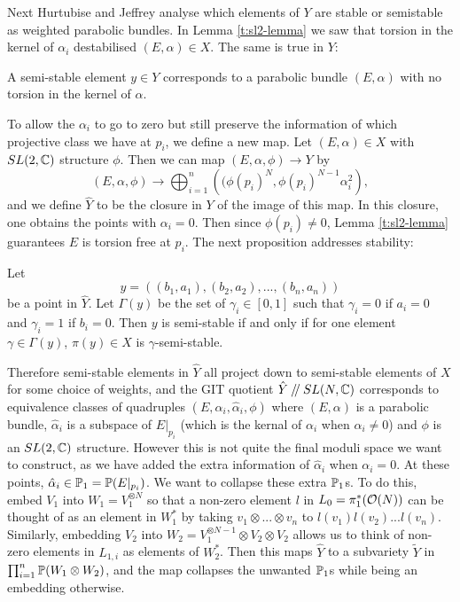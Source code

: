 	Next Hurtubise and Jeffrey analyse which elements of $Y$ are stable or semistable as weighted parabolic bundles. In Lemma \ref{t:sl2-lemma} we saw that torsion in the kernel of $\alpha_i$ destabilised $(E,\alpha) \in X$. The same is true in $Y$:
	\begin{lemma}
		A semi-stable element $y\in Y$ corresponds to a parabolic bundle $(E,\alpha)$ with no torsion in the kernel of $\alpha$.
	\end{lemma}
	To allow the $\alpha_i$ to go to zero but still preserve the information of which projective class we have at $p_i$, we define a new map. Let $(E,\alpha)\in X$ with $SL(2,\mathbb{C})$ structure $\phi$. Then we can map $(E,\alpha,\phi)\to Y$ by
	\begin{equation}
		(E,\alpha,\phi) \to \bigoplus_{i=1}^n\left(
		(\phi(p_i)^N, \phi(p_i)^{N-1}\alpha_i^2
		\right),
	\end{equation}
	and we define $\hat{Y}$ to be the closure in $Y$ of the image of this map. In this closure, one obtains the points with $\alpha_i =0$. Then since $\phi(p_i)\neq 0$, Lemma \ref{t:sl2-lemma} guarantees $E$ is torsion free at $p_i$. The next proposition addresses stability:
	\begin{theorem}
		Let 
		\begin{equation}
			y = \left(
			(b_1, a_1), (b_2, a_2),...,(b_n, a_n)
			\right)
		\end{equation}
		be a point in $\hat{Y}$. Let $\Gamma(y)$ be the set of $\gamma_i \in [0,1]$ such that $\gamma_i =0$ if $a_i =0$ and $\gamma_i = 1$ if $b_i = 0$. Then $y$ is semi-stable if and only if for one element $\gamma \in \Gamma(y)$, $\pi(y)\in X$ is $\gamma$-semi-stable.
	\end{theorem}
	Therefore semi-stable elements in $\hat{Y}$ all project down to semi-stable elements of $X$ for some choice of weights, and the GIT quotient $\hat{Y}\mathbin{/\mkern-4mu/} SL(N,\mathbb{C})$ corresponds to equivalence classes of quadruples $(E,\alpha_i, \hat{\alpha}_i, \phi)$ where $(E,\alpha)$ is a parabolic bundle, $\hat{\alpha}_i$ is a subspace of $E|_{p_i}$ (which is the kernal of $\alpha_i$ when $\alpha_i \neq 0$) and $\phi$ is an $SL(2,\mathbb{C})$ structure. However this is not quite the final moduli space we want to construct, as we have added the extra information of $\hat{\alpha}_i$ when $\alpha_i = 0$. At these points, $\hat{\alpha}_i \in \mathbb{P}_1=\mathbb{P}(E|_{p_i})$. We want to collapse these extra $\mathbb{P}_1$s. To do this, embed $V_1$ into $W_1 = V_1^{\otimes N}$ so that a non-zero element $l$ in $L_{0} = \pi_1^\ast(\mathcal{O}(N))$ can be thought of as an element in $W_1^\ast$ by taking $v_1\otimes...\otimes v_n$ to $l(v_1)l(v_2)...l(v_n)$. Similarly, embedding $V_2$ into $W_2 = V_1^{\otimes N-1}\otimes V_2\otimes V_2$ allows us to think of non-zero elements in $L_{1,i}$ as elements of $W_2^\ast$. Then this maps $\hat{Y}$ to a subvariety $\tilde{Y}$ in $\prod_{i=1}^n \mathbb{P}(W_1\otimes W_2)$, and the map collapses the unwanted $\mathbb{P}_1$s while being an embedding otherwise. 
	
